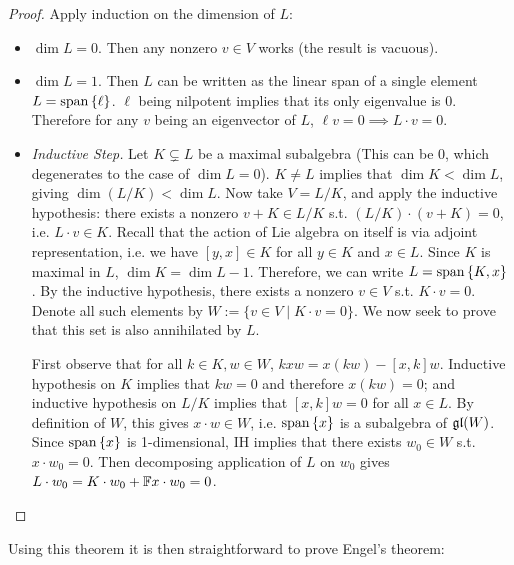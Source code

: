 \documentclass{article}
\begin{document}
\begin{proof}
    Apply induction on the dimension of $L$:
    \begin{itemize}
        \item $\dim L = 0$. Then any nonzero $v \in V$ works (the result is vacuous).
        \item $\dim L = 1$. Then $L$ can be written as the linear span of a single element $L = \operatorname{span}\left\{ \ell \right\}$. $\ell$ being nilpotent implies that its only eigenvalue is 0. Therefore for any $v$ being an eigenvector of $L$, $\ell v = 0 \implies L \cdot v = 0$.
        \item \emph{Inductive Step.} Let $K \subsetneq L$ be a maximal subalgebra (This can be 0, which degenerates to the case of $\dim L = 0$). $K \neq L$ implies that $\dim K < \dim L$, giving $\dim (L/K) < \dim L$. Now take $V = L/K$, and apply the inductive hypothesis: there exists a nonzero $v + K \in L/K$ s.t. $(L/K) \cdot (v + K) = 0$, i.e. $L\cdot v \in K$. Recall that the action of Lie algebra on itself is via adjoint representation, i.e. we have $[y, x] \in K$ for all $y \in K$ and $x \in L$. Since $K$ is maximal in $L$, $\dim K = \dim L - 1$. Therefore, we can write $L = \operatorname{span}\left\{ K, x \right\}$. By the inductive hypothesis, there exists a nonzero $v \in V$ s.t. $K \cdot v = 0$. Denote all such elements by $W := \{ v \in V \mid K\cdot v = 0 \}$. We now seek to prove that this set is also annihilated by $L$. 
        
        First observe that for all $k \in K, w \in W$, $kxw = x(kw) - [x, k]w$. Inductive hypothesis on $K$ implies that $kw = 0$ and therefore $x(kw) = 0$; and inductive hypothesis on $L/K$ implies that $[x, k]w = 0$ for all $x \in L$. By definition of $W$, this gives $x \cdot w \in W$, i.e. $\operatorname{span}\left\{ x \right\}$ is a subalgebra of $\mathfrak{gl}(W)$. Since $\operatorname{span}\left\{ x \right\}$ is 1-dimensional, IH implies that there exists $w_0 \in W$ s.t. $x \cdot w_0 = 0$. Then decomposing application of $L$ on $w_0$ gives $L \cdot w_0 = K \cdot w_0 + \mathbb{F} x \cdot w_0 = 0$.
    \end{itemize}
\end{proof}

\textstart
Using this theorem it is then straightforward to prove Engel's theorem:
\end{document}
